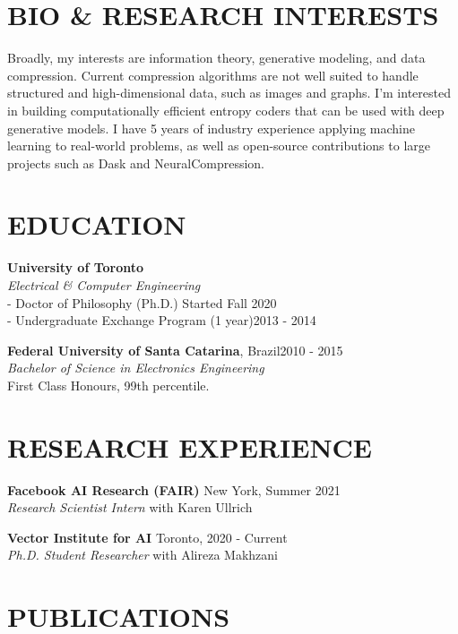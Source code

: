\documentclass[margin, line]{res}
\begin{document}
\address{\textbf{For more information}: \url{https://dsevero.com}}
\begin{resume}

\section{BIO \& RESEARCH INTERESTS}
Broadly, my interests are information theory, generative modeling, and data compression. Current compression algorithms are not well suited to handle structured and high-dimensional data, such as images and graphs. I'm interested in building computationally efficient entropy coders that can be used with deep generative models. I have 5 years of industry experience applying machine learning to real-world problems, as well as open-source contributions to large projects such as Dask and NeuralCompression.

\section{EDUCATION}
\textbf{University of Toronto}\\
{\sl Electrical \& Computer Engineering}\\
- Doctor of Philosophy (Ph.D.) \hfill Started Fall 2020\\
- Undergraduate Exchange Program (1 year)\hfill 2013 - 2014

\textbf{Federal University of Santa Catarina}, Brazil\hfill 2010 - 2015 \\
{\sl Bachelor of Science in Electronics Engineering}\\
First Class Honours, 99th percentile.

\section{RESEARCH EXPERIENCE}
\textbf{Facebook AI Research (FAIR)} \hfill New York, Summer 2021\\
{\sl Research Scientist Intern} with Karen Ullrich

\textbf{Vector Institute for AI} \hfill Toronto, 2020 - Current\\
{\sl Ph.D. Student Researcher} with Alireza Makhzani

\section{PUBLICATIONS}
\nocite{*}
\printbibliography[heading=none, keyword=publication]


\end{resume}
\end{document}
